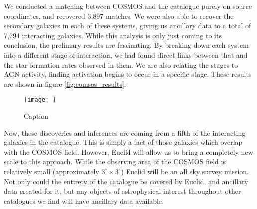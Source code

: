 \documentclass[11pt,usenatbib]{article}
\begin{document}
We conducted a matching between COSMOS and the \citet{O'Ryan} catalogue purely on source coordinates, and recovered 3,897 matches. We were also able to recover the secondary galaxies in each of these systems, giving us ancillary data to a total of 7,794 interacting galaxies. While this analysis is only just coming to its conclusion, the prelimary results are fascinating. By breaking down each system into a different stage of interaction, we had found direct links between that and the star formation rates observed in them. We are also relating the stages to AGN activity, finding activation begins to occur in a specific stage. These results are shown in figure \ref{fig:comsos_results}.

\begin{figure}
    \centering
    \texttt{[image: ]}
    \caption{Caption}
    \label{fig:cosmos-label}
\end{figure}

Now, these discoveries and inferences are coming from a fifth of the interacting galaxies in the \citet{O'Ryan} catalogue. This is simply a fact of those galaxies which overlap with the COSMOS field. However, Euclid will allow us to bring a completely new scale to this approach. While the observing area of the COSMOS field is relatively small (approximately $3^{\circ} \times 3^{\circ}$) Euclid will be an all sky survey mission. Not only could the entirety of the \citet{O'Ryan} catalogue be covered by Euclid, and ancillary data created for it, but any objects of astrophysical interest throughout other catalogues we find will have ancillary data available.
\end{document}
